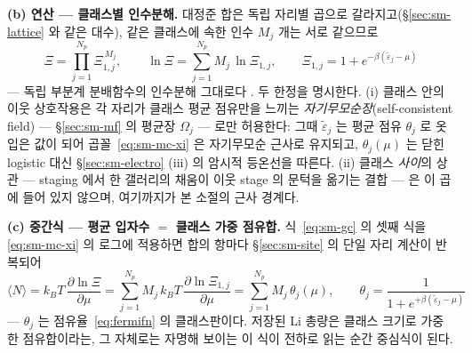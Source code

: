 \textbf{(b) 연산 --- 클래스별 인수분해.} 대정준 합은 독립 자리별 곱으로 갈라지고(\S\ref{sec:sm-lattice}
와 같은 대수), 같은 클래스에 속한 인수 $M_j$ 개는 서로 같으므로
\begin{equation}
\Xi=\prod_{j=1}^{N_p}\Xi_{1,j}^{\,M_j},\qquad
\ln\Xi=\sum_{j=1}^{N_p}M_j\,\ln\Xi_{1,j},\qquad
\Xi_{1,j}=1+e^{-\beta(\tilde\varepsilon_j-\mu)}
\label{eq:sm-mc-xi}
\end{equation}
--- 독립 부분계 분배함수의 인수분해 그대로다 \cite{hill1960,mcquarrie1976}. 두 한정을 명시한다.
(i) 클래스 안의 이웃 상호작용은 각 자리가 클래스 평균 점유만을 느끼는
\emph{자기무모순장}(self-consistent field) --- \S\ref{sec:sm-mf} 의 평균장 $\Omega_j$ --- 로만 허용한다:
그때 $\tilde\varepsilon_j$ 는 평균 점유 $\theta_j$ 로 옷입은 값이 되어 곱꼴~\eqref{eq:sm-mc-xi} 은
자기무모순 근사로 유지되고, $\theta_j(\mu)$ 는 닫힌 logistic 대신 \S\ref{sec:sm-electro} (iii) 의 암시적
등온선을 따른다. (ii) 클래스 \emph{사이}의 상관 --- staging 에서 한 갤러리의 채움이 이웃 stage 의 문턱을
옮기는 결합 --- 은 이 곱에 들어 있지 않으며, 여기까지가 본 소절의 근사 경계다.

\textbf{(c) 중간식 --- 평균 입자수 $=$ 클래스 가중 점유합.} 식~\eqref{eq:sm-gc} 의 셋째 식을
\eqref{eq:sm-mc-xi} 의 로그에 적용하면 합의 항마다 \S\ref{sec:sm-site} 의 단일 자리 계산이 반복되어
\begin{equation}
\langle N\rangle
=k_BT\,\frac{\partial\ln\Xi}{\partial\mu}
=\sum_{j=1}^{N_p}M_j\,k_BT\,\frac{\partial\ln\Xi_{1,j}}{\partial\mu}
=\sum_{j=1}^{N_p}M_j\,\theta_j(\mu),
\qquad
\theta_j=\frac{1}{1+e^{+\beta(\tilde\varepsilon_j-\mu)}}
\label{eq:sm-mc-avg}
\end{equation}
--- $\theta_j$ 는 점유율~\eqref{eq:fermifn} 의 클래스판이다. 저장된 Li 총량은 클래스 크기로 가중한
점유합이라는, 그 자체로는 자명해 보이는 이 식이 전하로 읽는 순간 중심식이 된다.

